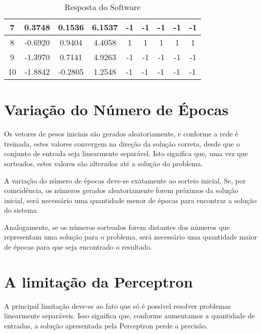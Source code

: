 \documentclass{article}
\begin{document}
\begin{table}[]
\begin{tabular}{c|c|c|c|c|c|c|c|c|}
\multicolumn{1}{|c|}{7}                & 0.3748       & 0.1536       & 6.1537     & -1                      & -1                      & -1                      & -1                      & -1                      \\ \hline
\multicolumn{1}{|c|}{8}                & -0.6920      & 0.9404       & 4.4058     & 1                       & 1                       & 1                       & 1                       & 1                       \\ \hline
\multicolumn{1}{|c|}{9}                & -1.3970      & 0.7141       & 4.9263     & -1                      & -1                      & -1                      & -1                      & -1                      \\ \hline
\multicolumn{1}{|c|}{10}               & -1.8842      & -0.2805      & 1.2548     & \multicolumn{1}{l|}{-1} & \multicolumn{1}{l|}{-1} & \multicolumn{1}{l|}{-1} & \multicolumn{1}{l|}{-1} & \multicolumn{1}{l|}{-1} \\ \hline
\end{tabular}
\caption{Resposta do Software}
\end{table}

\section{Variação do Número de Épocas}
\hspace*{15pt} Os vetores de pesos iniciais são gerados aleatoriamente, e conforme a rede é treinada, estes valores convergem na direção da solução correta, desde que o conjunto de entrada seja linearmente separável. Isto significa que, uma vez que sorteados, estes valores são alterados até a solução do problema.

\par A variação do número de épocas deve-se exatamente ao sorteio inicial. Se, por coincidência, os números gerados aleatoriamente forem próximos da solução inicial, será necessário uma quantidade menor de épocas  para encontrar a solução do sistema.

\par Analogamente, se os números sorteados forem distantes dos números que representam uma solução para o problema, será necessário uma quantidade maior de épocas para que seja encontrado o resultado.

\section{A limitação da Perceptron}
\hspace*{15pt} A principal limitação deve-se ao fato que só é possível resolver problemas linearmente separáveis. Isso significa que, conforme aumentamos a quantidade de entradas, a solução apresentada pela Perceptron perde a precisão.
\end{document}
